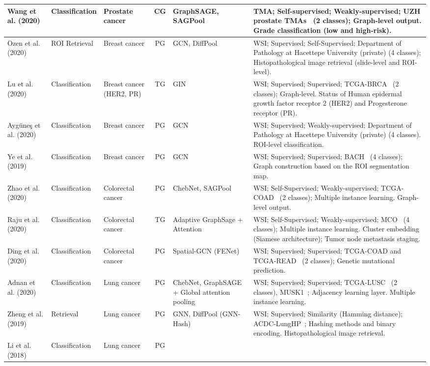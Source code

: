 \begin{table}[t]
{\begin{tabular}{
l
>{\raggedright\arraybackslash}p{1.7cm}
>{\raggedright\arraybackslash}p{2.2cm}
c
>{\raggedright\arraybackslash}p{3cm} 
>{\raggedright\arraybackslash}p{10cm}}
Wang et al. (2020)~ & Classification &  Prostate cancer & CG &
GraphSAGE, SAGPool & TMA; Self-supervised; Weakly-supervised; UZH prostate TMAs~ (2 classes); Graph-level output. Grade classification (low and high-risk). \\
\midrule
Ozen et al. (2020)~ & ROI Retrieval &  Breast cancer & PG &
GCN, DiffPool & WSI; Supervised; Self-Supervised; Department of Pathology at Hacettepe University (private) (4 classes); Histopathological image retrieval (slide-level and ROI-level). \\
Lu et al. (2020)~ & Classification & Breast cancer (HER2, PR) & TG &
GIN & WSI; Supervised; Supervised; TCGA-BRCA~ (2 classes); Graph-level. Status of Human epidermal growth factor receptor 2 (HER2) and Progesterone receptor (PR). \\
Ayg{\"u}ne{\c{s}} et al. (2020)~ & Classification &  Breast cancer & PG &
GCN & WSI; Supervised; Weakly-supervised; Department of Pathology at Hacettepe University (private) (4 classes). ROI-level classification. \\
Ye et al. (2019)~ & Classification & Breast cancer & PG &
GCN & WSI; Supervised; Supervised; BACH~ (4 classes); Graph construction based on the ROI segmentation map. \\
Zhao et al. (2020)~ & Classification & Colorectal cancer & PG &
ChebNet, SAGPool & WSI; Self-Supervised; Weakly-supervised;  TCGA-COAD~ (2 classes); Multiple instance learning. Graph-level output. \\
Raju et al. (2020)~ & Classification & Colorectal cancer & TG &
Adaptive GraphSage + Attention & WSI; Self-Supervised; Weakly-supervised; MCO~ (4 classes); Multiple instance learning. Cluster embedding (Siamese architecture); Tumor node metastasis staging. \\
Ding et al. (2020)~ & Classification &  Colorectal cancer & PG &
Spatial-GCN (FENet) & WSI; Supervised; Supervised; TCGA-COAD and TCGA-READ~ (2 classes); Genetic mutational prediction. \\
Adnan et al. (2020)~ & Classification & Lung cancer & PG &
ChebNet, GraphSAGE + Global attention pooling & WSI; Supervised; Supervised; TCGA-LUSC~ (2 classes),  MUSK1~; Adjacency learning layer. Multiple instance learning. \\
Zheng et al. (2019)~ & Retrieval & Lung cancer & PG &
GNN, DiffPool (GNN-Hash) & WSI; Supervised; Similarity (Hamming distance); ACDC-LungHP~; Hashing methods and binary encoding. Histopathological image retrieval.  \\
Li et al. (2018)~ & Classification & Lung cancer & PG &

\end{tabular}}
\end{table}
